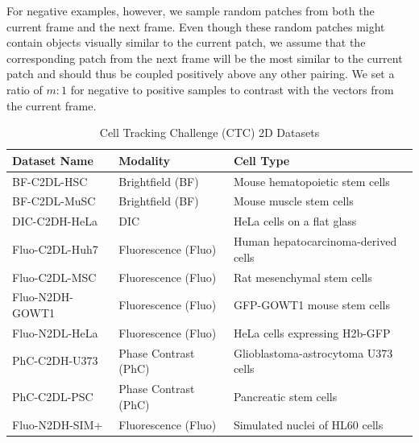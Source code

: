 \documentclass[./dissertation.tex]{subfiles}
\begin{document}
For negative examples, however, we sample random patches from both the current frame and the next frame. Even though these random patches might contain objects visually similar to the current patch, we assume that the corresponding patch from the next frame will be the most similar to the current patch and should thus be coupled positively above any other pairing. We set a ratio of \(m : 1\) for negative to positive samples to contrast with the vectors from the current frame.


\begin{table}[ht]
    \caption{Cell Tracking Challenge (CTC) 2D Datasets}
    \centering

    \label{tab:ctc_datasets}
    \begin{tabular}{|l|l|l|}
        \hline
        \textbf{Dataset Name} & \textbf{Modality}    & \textbf{Cell Type}                  \\ \hline
        BF-C2DL-HSC           & Brightfield (BF)     & Mouse hematopoietic stem cells      \\ \hline
        BF-C2DL-MuSC          & Brightfield (BF)     & Mouse muscle stem cells             \\ \hline
        DIC-C2DH-HeLa         & DIC                  & HeLa cells on a flat glass          \\ \hline
        Fluo-C2DL-Huh7        & Fluorescence (Fluo)  & Human hepatocarcinoma-derived cells \\ \hline
        Fluo-C2DL-MSC         & Fluorescence (Fluo)  & Rat mesenchymal stem cells          \\ \hline
        Fluo-N2DH-GOWT1       & Fluorescence (Fluo)  & GFP-GOWT1 mouse stem cells          \\ \hline
        Fluo-N2DL-HeLa        & Fluorescence (Fluo)  & HeLa cells expressing H2b-GFP       \\ \hline
        PhC-C2DH-U373         & Phase Contrast (PhC) & Glioblastoma-astrocytoma U373 cells \\ \hline
        PhC-C2DL-PSC          & Phase Contrast (PhC) & Pancreatic stem cells               \\ \hline
        Fluo-N2DH-SIM+        & Fluorescence (Fluo)  & Simulated nuclei of HL60 cells      \\ \hline
    \end{tabular}
\end{table}




\end{document}
